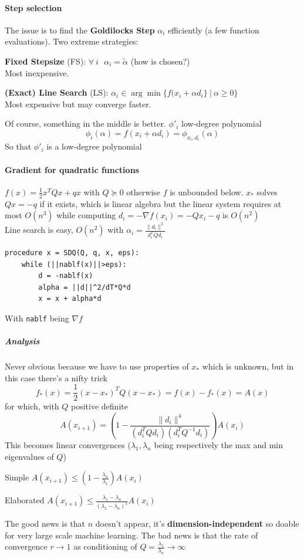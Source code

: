\documentclass[10pt]{report}
\begin{document}
\paragraph{Step selection} The issue is to find the \textbf{Goldilocks Step} $\alpha_i$ efficiently (a few function evaluations). Two extreme strategies:
\begin{list}{}{}
	\item \textbf{Fixed Stepsize} (FS): $\forall\:i\:\:\:\alpha_i = \tilde{\alpha}$ (how is chosen?)\\
	Most inexpensive.
	\item \textbf{(Exact) Line Search} (LS): $\alpha_i\in \arg\min\{f(x_i+\alpha d_i\}\:|\:\alpha\geq 0\}$\\
	Most expensive but may converge faster.
\end{list}
Of course, something in the middle is better. $\phi'_i$ low-degree polynomial
$$\phi_i(\alpha) = f(x_i+\alpha d_i) = \phi_{x_i,d_i}(\alpha)$$
So that $\phi'_i$ is a low-degree polynomial
\paragraph{Gradient for quadratic functions} $f(x) = \frac{1}{2}x^TQx + qx$ with $Q\succeq 0$ otherwise $f$ is unbounded below. $x_*$ solves $Qx = -q$ if it exists, which is linear algebra but the linear system requires at most $O(n^3)$ while computing $d_i = -\nabla f(x_i) = -Qx_i - q$ is $O(n^2)$\\
Line search is easy, $O(n^2)$ with $\alpha_i = \frac{\|d_i\|^2}{d_i^TQd_i}$
\begin{lstlisting}[style=myPython]
procedure x = SDQ(Q, q, x, eps):
	while (||nablf(x)||>eps):
		d = -nablf(x)
		alpha = ||d||^2/dT*Q*d
		x = x + alpha*d
\end{lstlisting}
With \texttt{nablf} being $\nabla f$
\subparagraph{Analysis} Never obvious because we have to use properties of $x_*$ which is unknown, but in this case there's a nifty trick
$$f_*(x) = \frac{1}{2}(x-x_*)^TQ(x-x_*) = f(x) - f_*(x) = A(x)$$
for which, with $Q$ positive definite $$A(x_{i+1}) = \left(1-\frac{\|d_i\|^4}{(d_i^TQd_i)(d_i^TQ^{-1}d_i)} \right)A(x_i)$$
This becomes linear convergences ($\lambda_1,\lambda_{n}$ being respectively the max and min eigenvalues of $Q$)
\begin{list}{}{}
	\item Simple $A(x_{i+1}) \leq (1-\frac{\lambda_n}{\lambda_1})A(x_i)$
	\item Elaborated $A(x_{i+1}) \leq \frac{\lambda_1 - \lambda_n}{(\lambda_1 - \lambda_n)^2}A(x_i)$
\end{list}
The good news is that $n$ doesn't appear, it's \textbf{dimension-independent} so doable for very large scale machine learning. The bad news is that the rate of convergence $r\rightarrow 1$ as conditioning of $Q = \frac{\lambda_1}{\lambda_n}\rightarrow\infty$
\end{document}
